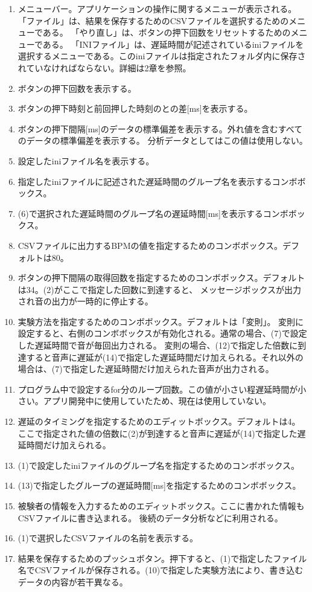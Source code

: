 \documentclass{article} %
\begin{document}
\begin{enumerate}
  \item メニューバー。アプリケーションの操作に関するメニューが表示される。
  「ファイル」は、結果を保存するためのCSVファイルを選択するためのメニューである。
  「やり直し」は、ボタンの押下回数をリセットするためのメニューである。
  「INIファイル」は、遅延時間が記述されているiniファイルを選択するメニューである。このiniファイルは指定されたフォルダ内に保存されていなければならない。詳細は2章を参照。
  \item ボタンの押下回数を表示する。
  \item ボタンの押下時刻と前回押した時刻のとの差[ms]を表示する。 
  \item ボタンの押下間隔[ms]のデータの標準偏差を表示する。外れ値を含むすべてのデータの標準偏差を表示する。
  分析データとしてはこの値は使用しない。
  \item 設定したiniファイル名を表示する。
  \item 指定したiniファイルに記述された遅延時間のグループ名を表示するコンボボックス。
  \item (6)で選択された遅延時間のグループ名の遅延時間[ms]を表示するコンボボックス。
  \item CSVファイルに出力するBPMの値を指定するためのコンボボックス。デフォルトは80。
  \item ボタンの押下間隔の取得回数を指定するためのコンボボックス。デフォルトは34。(2)がここで指定した回数に到達すると、
  メッセージボックスが出力され音の出力が一時的に停止する。
  \item 実験方法を指定するためのコンボボックス。デフォルトは「変則」。
  変則に設定すると、右側のコンボボックスが有効化される。通常の場合、(7)で設定した遅延時間で音が毎回出力される。
  変則の場合、(12)で指定した倍数に到達すると音声に遅延が(14)で指定した遅延時間だけ加えられる。それ以外の場合は、(7)で指定した遅延時間だけ加えられた音声が出力される。
  \item プログラム中で設定するfor分のループ回数。この値が小さい程遅延時間が小さい。アプリ開発中に使用していたため、現在は使用していない。
  \item 遅延のタイミングを指定するためのエディットボックス。デフォルトは4。ここで指定された値の倍数に(2)が到達すると音声に遅延が(14)で指定した遅延時間だけ加えられる。
  \item (1)で設定したiniファイルのグループ名を指定するためのコンボボックス。
  \item (13)で指定したグループの遅延時間[ms]を指定するためのコンボボックス。
  \item 被験者の情報を入力するためのエディットボックス。ここに書かれた情報もCSVファイルに書き込まれる。
  後続のデータ分析などに利用される。
  \item (1)で選択したCSVファイルの名前を表示する。
  \item 結果を保存するためのプッシュボタン。押下すると、(1)で指定したファイル名でCSVファイルが保存される。(10)で指定した実験方法により、書き込むデータの内容が若干異なる。
\end{enumerate}
\end{document}
